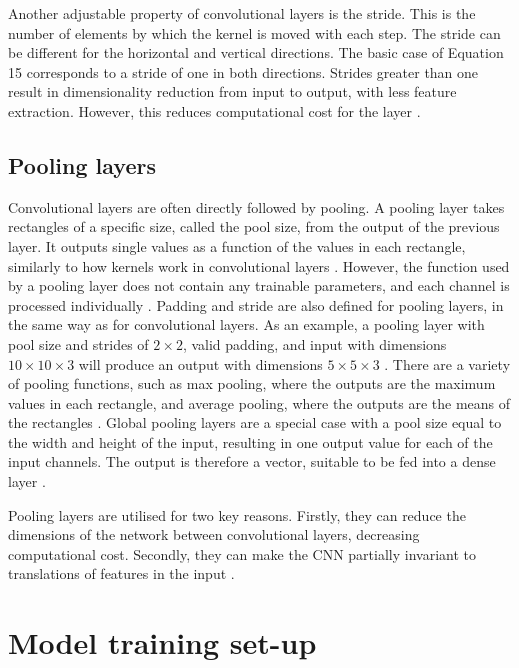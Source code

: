 \documentclass[12pt]{article}
\begin{document}
Another adjustable property of convolutional layers is the stride. This is the number of elements by which the kernel is moved with each step. The stride can be different for the horizontal and vertical directions. The basic case of Equation 15 corresponds to a stride of one in both directions. Strides greater than one result in dimensionality reduction from input to output, with less feature extraction. However, this reduces computational cost for the layer \cite{Aghdam17, Goodfellow16}.

\subsection{Pooling layers}
Convolutional layers are often directly followed by pooling. A pooling layer takes rectangles of a specific size, called the pool size, from the output of the previous layer. It outputs single values as a function of the values in each rectangle, similarly to how kernels work in convolutional layers \cite{Aghdam17, Goodfellow16}. However, the function used by a pooling layer does not contain any trainable parameters, and each channel is processed individually \cite{Aghdam17, Goodfellow16}. Padding and stride are also defined for pooling layers, in the same way as for convolutional layers. As an example, a pooling layer with pool size and strides of $2 \times 2$, valid padding, and input with dimensions $10 \times 10 \times 3$ will produce an output with dimensions $5 \times 5 \times 3$ \cite{Aghdam17, Goodfellow16}. There are a variety of pooling functions, such as max pooling, where the outputs are the maximum values in each rectangle, and average pooling, where the outputs are the means of the rectangles \cite{Goodfellow16}. Global pooling layers are a special case with a pool size equal to the width and height of the input, resulting in one output value for each of the input channels. The output is therefore a vector, suitable to be fed into a dense layer \cite{Aghdam17}.

Pooling layers are utilised for two key reasons. Firstly, they can reduce the dimensions of the network between convolutional layers, decreasing computational cost. Secondly, they can make the CNN partially invariant to translations of features in the input \cite{Aghdam17, Goodfellow16}.
\section{Model training set-up}
\end{document}
